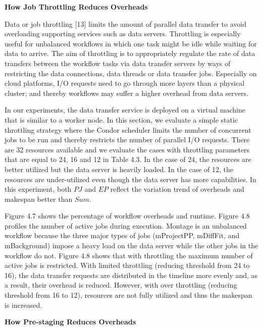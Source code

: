 \documentclass[final,5p,times,twocolumn]{elsarticle}
\begin{document}
\textbf{How Job Throttling Reduces Overheads}

Data or job throttling [13] limits the amount of parallel data transfer to avoid overloading supporting services such as data servers. Throttling is especially useful for unbalanced workflows in which one task might be idle while waiting for data to arrive. The aim of throttling is to appropriately regulate the rate of data transfers between the workflow tasks via data transfer servers by ways of restricting the data connections, data threads or data transfer jobs. Especially on cloud platforms, I/O requests need to go through more layers than a physical cluster; and thereby workflows may suffer a higher overhead from data servers.

In our experiments, the data transfer service is deployed on a virtual machine that is similar to a worker node.  In this section, we evaluate a simple static throttling strategy where the Condor scheduler limits the number of concurrent jobs to be run and thereby restricts the number of parallel I/O requests. There are 32 resources available and we evaluate the cases with throttling parameters that are equal to 24, 16 and 12 in Table 4.3. In the case of 24, the resources are better utilized but the data server is heavily loaded. In the case of 12, the resources are under-utilized even though the data server has more capabilities. In this experiment, both $PJ$ and $EP$ reflect the variation trend of overheads and makespan better than $Sum$. 

Figure 4.7 shows the percentage of workflow overheads and runtime. Figure 4.8 profiles the number of active jobs during execution. Montage is an unbalanced workflow because the three major types of jobs (mProjectPP, mDiffFit, and mBackground) impose a heavy load on the data server while the other jobs in the workflow do not. Figure 4.8 shows that with throttling the maximum number of active jobs is restricted. With limited throttling (reducing threshold from 24 to 16), the data transfer requests are distributed in the timeline more evenly and, as a result, their overhead is reduced. However, with over throttling (reducing threshold from 16 to 12), resources are not fully utilized and thus the makespan is increased. 

\textbf{How Pre-staging Reduces Overheads}
\end{document}
